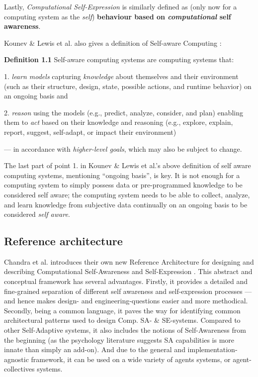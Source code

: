 	Lastly, \textit{Computational Self-Expression} is similarly defined as  (only now for a computing system as the \textit{self}) \textbf{behaviour based on \textit{computational} self awareness}.
	\newline

	Kounev \& Lewis et al. also gives a definition of Self-aware Computing \cite{sacs17_ch1}:

	\textbf{Definition 1.1} Self-aware computing systems are computing systems that:

	1. \textit{learn models} capturing \textit{knowledge} about themselves and their environment (such as their structure, design, state, possible actions, and runtime behavior) on an ongoing basis and

	2. \textit{reason} using the models (e.g., predict, analyze, consider, and plan) enabling them to \textit{act} based on their knowledge and reasoning (e.g., explore, explain, report, suggest, self-adapt, or impact their environment)

	— in accordance with \textit{higher-level goals}, which may also be subject to change.

	The last part of point 1. in Kounev \& Lewis et al.'s above definition of self aware computing systems, mentioning ``ongoing basis'', is key. It is not enough for a computing system to simply possess data or pre-programmed knowledge to be considered self aware; the computing system needs to be able to collect, analyze, and learn knowledge from subjective data continually on an ongoing basis to be considered \textit{self aware}.

	\subsection{Reference architecture}

	Chandra et al. introduces their own new Reference Architecture for designing and describing Computational Self-Awareness and Self-Expression \cite{sacs16_ch4}. This abstract and conceptual framework has several advantages. Firstly, it provides a detailed and fine-grained separation of different self awareness and self-expression processes — and hence makes design- and engineering-questions easier and more methodical. Secondly, being a common language, it paves the way for identifying common architectural patterns used to design Comp. SA- \& SE-systems. Compared to other Self-Adaptive systems, it also includes the notions of Self-Awareness from the beginning (as the psychology literature suggests SA capabilities is more innate than simply an add-on). And due to the general and implementation-agnostic framework, it can be used on a wide variety of agents systems, or agent-collectives systems.


